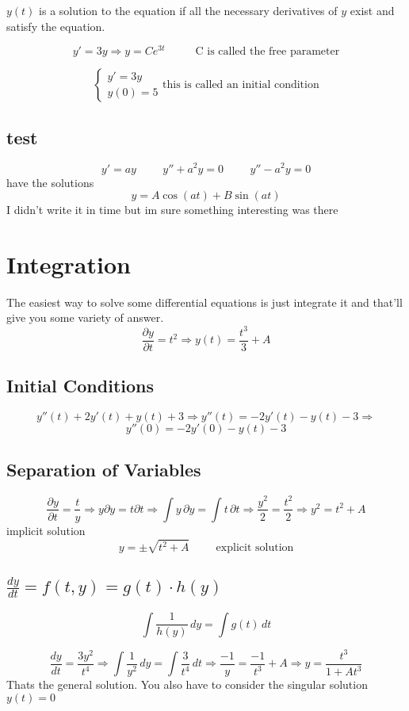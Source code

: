\documentclass[fleqn]{report}
\newcommand{\hp}{\hspace{1cm}}
\newcommand{\del}{\partial}
\newcommand{\pdif}[2]{ \frac{\partial #1}{ \partial #2} }
\begin{document}
$y(t)$ is a solution to the equation if all the necessary derivatives of $y$ exist and satisfy the equation.

\[
y' = 3y \Longrightarrow y = Ce^{3t} \hp \textrm{ C is called the free parameter}
\]

\[
\begin{cases}
y' = 3y \\
y(0) = 5 
\end{cases}
\textrm{this is called an initial condition}
\]


\subsection{test}
\[
y' = ay 
\hp
y'' + a^2y = 0
\hp
y'' - a^2y = 0
\]
have the solutions
\[
y = A\cos(at) + B\sin(at)
\]
I didn't write it in time but im sure something interesting was there

\section{Integration}
The easiest way to solve some differential equations is just integrate it and that'll give you some variety of answer.
\[
\pdif{y}{t} = t^2
\Longrightarrow
y(t) = \frac{t^3}{3} + A
\]

\subsection{Initial Conditions}
\[
y''(t) + 2y'(t) + y(t) + 3
\Rightarrow
y''(t) = -2y'(t) - y(t) - 3
\Rightarrow
\]
\[
y''(0) = -2y'(0) - y(t) - 3
\]

\subsection{Separation of Variables}
\[
\pdif{y}{t} = \frac{t}{y}
\Rightarrow
y \del y = t \del t
\Rightarrow
\int y \, \del y = \int t \, \del t
\Rightarrow
\frac{y^2}{2} = \frac{t^2}{2}
\Rightarrow
y^2 = t^2 + A
\]
implicit solution
\[
y = \pm \sqrt{t^2 + A} \hp
\textrm{explicit solution}
\]


\subsection{$\frac{dy}{dt} = f(t, y) = g(t) \cdot h(y)$}
\[
\int \frac{1}{h(y)} \, d y = \int g(t) \, d t
\]

\[
\frac{dy}{dt} = \frac{3y^2}{t^4}
\Rightarrow
\int \frac{1}{y^2} \, dy = \int \frac{3}{t^4} \, dt
\Rightarrow
\frac{-1}{y} = \frac{-1}{t^3} + A
\Rightarrow
y = \frac{t^3}{1 + At^3}
\]
Thats the general solution. You also have to consider the singular solution $y(t) = 0$
\end{document}
